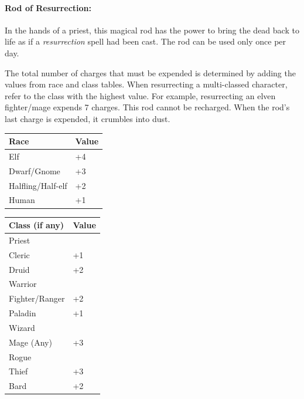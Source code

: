 \begin{multicols}{2}
\paragraph{Rod of Resurrection:} In the hands of a priest, this magical rod has the power to bring the dead back to life as if a \textit{resurrection} spell had been cast.  The rod can be used only once per day.  

The total number of charges that must be expended is determined by adding the values from race and class tables.  When resurrecting a multi-classed character, refer to the class with the highest value.  For example, resurrecting an elven fighter/mage expends 7 charges.  This rod cannot be recharged.  When the rod's last charge is expended, it crumbles into dust.

\noindent
\begin{tabular}{|p{}|p{}|}
\hline
Race	& Value \\
\hline\hline
\rowcolor[gray]{.9}Elf	& +4 \\
Dwarf/Gnome	& +3 \\
\rowcolor[gray]{.9}Halfling/Half-elf	& +2 \\
Human	& +1 \\
\hline
\end{tabular}

\noindent
\begin{tabular}{|p{}|p{}|}
\hline
Class (if any)	& Value \\
\hline\hline
\rowcolor[gray]{.9}Priest	& \\
\rowcolor[gray]{.9}\hspace{1em}Cleric	& +1 \\
\hspace{1em}Druid	& +2 \\
\rowcolor[gray]{.9}Warrior	& \\
\rowcolor[gray]{.9}\hspace{1em}Fighter/Ranger	& +2 \\
\hspace{1em}Paladin	& +1 \\
\rowcolor[gray]{.9}Wizard	& \\
\rowcolor[gray]{.9}\hspace{1em}Mage (Any)	& +3 \\
Rogue	& \\
\hspace{1em}Thief	& +3 \\
\rowcolor[gray]{.9}\hspace{1em}Bard	& +2 \\
\hline
\end{tabular}


\end{multicols}
